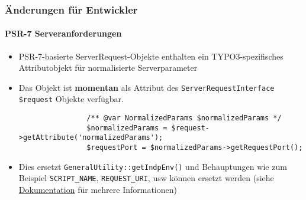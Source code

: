 
\begin{frame}[fragile]
	\frametitle{Änderungen für Entwickler}
	\framesubtitle{PSR-7 Serveranforderungen}

	\lstset{basicstyle=\tiny\ttfamily}

	\begin{itemize}

		\item PSR-7-basierte ServerRequest-Objekte enthalten ein TYPO3-spezifisches 
			Attributobjekt für normalisierte Serverparameter
		\item Das Objekt ist \textbf{momentan} als Attribut des 
			\texttt{ServerRequestInterface \$request} Objekte verfügbar.

			\begin{lstlisting}
				/** @var NormalizedParams $normalizedParams */
				$normalizedParams = $request->getAttribute('normalizedParams');
				$requestPort = $normalizedParams->getRequestPort();
			\end{lstlisting}

		\item Dies ersetzt \texttt{GeneralUtility::getIndpEnv()} und Behauptungen
			wie zum Beispiel \texttt{SCRIPT\_NAME}, \texttt{REQUEST\_URI}, usw können ersetzt werden
			\newline
			(siehe \href{https://docs.typo3.org/typo3cms/extensions/core/latest/Changelog/9.2/Feature-83736-ExtendedPSR-7RequestsWithTYPO3ServerParameters.html}{Dokumentation} für mehrere Informationen)

	\end{itemize}

\end{frame}


